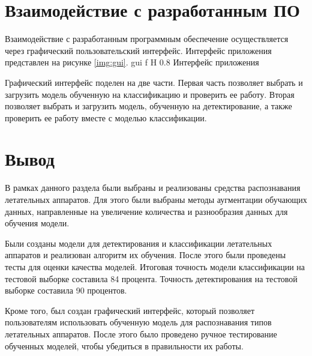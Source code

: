 \section{Взаимодействие с разработанным ПО}

Взаимодействие с разработанным программным обеспечение осуществляется через графический пользовательский интерфейс. Интерфейс приложения представлен на рисунке \ref{img:gui}.
{gui} %
{f} %
{H} %
{0.8\textwidth} %
{Интерфейс приложения} %

Графический интерфейс поделен на две части. Первая часть позволяет выбрать и загрузить модель обученную на классификацию и проверить ее работу. Вторая позволяет выбрать и загрузить модель, обученную на детектирование, а также проверить ее работу вместе с моделью классификации.

\section{Вывод}

В рамках данного раздела были выбраны и реализованы средства распознавания летательных аппаратов. Для этого были выбраны методы аугментации обучающих данных, направленные на увеличение количества и разнообразия данных для обучения модели. 

Были созданы модели для детектирования и классификации летательных аппаратов и реализован алгоритм их обучения. После этого были проведены тесты для оценки качества моделей. Итоговая точность модели классификации на тестовой выборке составила 84 процента. Точность детектирования на тестовой выборке составила 90 процентов.

Кроме того, был создан графический интерфейс, который позволяет пользователям использовать обученную модель для распознавания типов летательных аппаратов. После этого было проведено ручное тестирование обученных моделей, чтобы убедиться в правильности их работы.